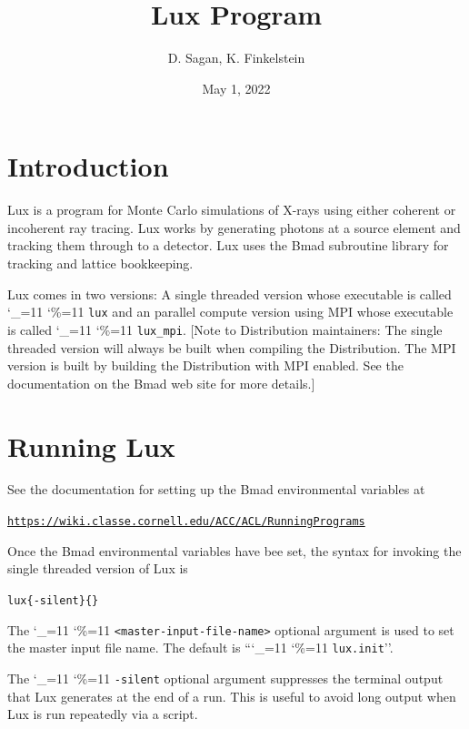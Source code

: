\documentclass[11pt]{article}
\title{Lux Program}
\author{D. Sagan, K. Finkelstein}
\date{May 1, 2022}
\newcommand{\lux}{Lux\xspace}
\newcommand\ttcmd{\begingroup\catcode`\_=11 \catcode`\%=11 \dottcmd}
\newcommand\dottcmd[1]{\texttt{#1}\endgroup}
\newcommand{\vn}{\ttcmd}
\newenvironment{example}
  {\vspace{\ExBeg} \begin{alltt}}
  {\end{alltt} \vspace{\ExEnd}}
\newlength{\ExBeg}
\newlength{\ExEnd}
\begin{document}
\maketitle

\tableofcontents

\section{Introduction} 
\label{s:intro}

\lux is a program for Monte Carlo simulations of X-rays using either coherent or incoherent ray
tracing. \lux works by generating photons at a source element and tracking them through to a
detector. \lux uses the Bmad subroutine library\cite{b:bmad} for tracking and lattice bookkeeping.

\lux comes in two versions: A single threaded version whose executable is called \vn{lux} and an
parallel compute version using MPI whose executable is called \vn{lux_mpi}. [Note to Distribution
maintainers: The single threaded version will always be built when compiling the Distribution. The
MPI version is built by building the Distribution with MPI enabled. See the documentation on the Bmad
web site for more details.]

\section{Running \lux} 
\label{s:run}

See the documentation for setting up the Bmad environmental variables at
\begin{example}
  \url{https://wiki.classe.cornell.edu/ACC/ACL/RunningPrograms}
\end{example}

Once the Bmad environmental variables have bee set, the syntax for invoking the single threaded
version of \lux is
\begin{example}
  lux \{-silent\} \{<master-input-file-name>\}
\end{example}
The \vn{<master-input-file-name>} optional argument is used to set the master input file name. The
default is ``\vn{lux.init}''.

The \vn{-silent} optional argument suppresses the terminal output that \lux generates at the end of
a run. This is useful to avoid long output when \lux is run repeatedly via a script.
\end{document}
